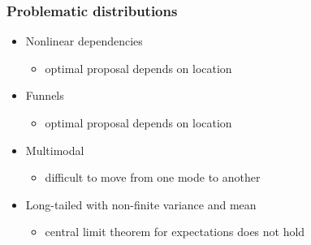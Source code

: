 \documentclass[10pt]{beamer}
\begin{document}
\begin{frame}

\frametitle{ Problematic distributions}

  \begin{itemize}
  \item<1-> Nonlinear dependencies
    \begin{itemize}
    \item optimal proposal depends on location
    \end{itemize}
  \item<2-> Funnels
    \begin{itemize}
    \item optimal proposal depends on location
    \end{itemize}
  \item<3-> Multimodal
    \begin{itemize}
    \item difficult to move from one mode to another
    \end{itemize}
  \item<4-> Long-tailed with non-finite variance and mean
    \begin{itemize}
    \item central limit theorem for expectations does not hold
    \end{itemize}
  \end{itemize}

\end{frame}

\end{document}
